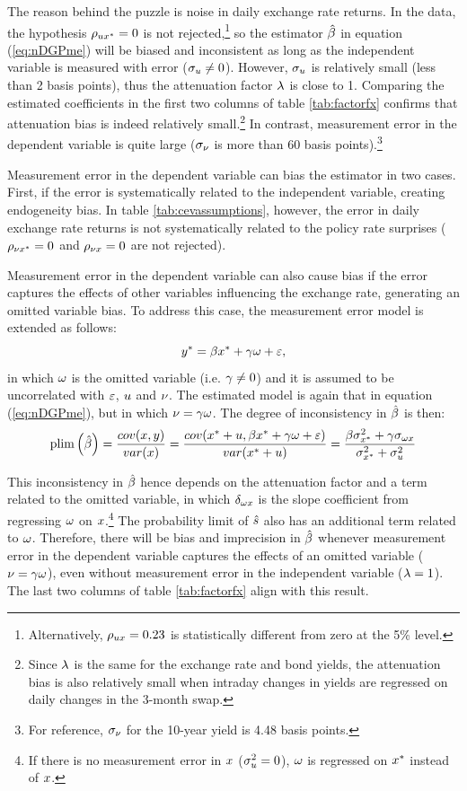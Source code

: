 \documentclass[a4paper,12pt]{article} 		%
\begin{document}
\begin{appendices}
The reason behind the puzzle is noise in daily exchange rate returns. In the data, the hypothesis \(\rho_{u x^{*}} = 0\) is not rejected,\footnote{Alternatively, \(\rho_{u x} = 0.23\) is statistically different from zero at the 5\% level.} so the estimator \(\hat{\beta}\) in equation (\ref{eq:nDGPme}) will be biased and inconsistent as long as the independent variable is measured with error (\(\sigma_{u} \neq 0\)). 
However, \(\sigma_{u}\) is relatively small (less than 2 basis points), thus the attenuation factor \(\lambda\) is close to 1. Comparing the estimated coefficients in the first two columns of table \ref{tab:factorfx} confirms that attenuation bias is indeed relatively small.\footnote{Since \(\lambda\) is the same for the exchange rate and bond yields, the attenuation bias is also relatively small when intraday changes in yields are regressed on daily changes in the 3-month swap.} In contrast, measurement error in the dependent variable is quite large (\(\sigma_{\nu}\) is more than 60 basis points).\footnote{For reference, \(\sigma_{\nu}\) for the 10-year yield is 4.48 basis points.} 

Measurement error in the dependent variable can bias the estimator in two cases. First, if the error is systematically related to the independent variable, creating endogeneity bias. In table \ref{tab:cevassumptions}, however, the error in daily exchange rate returns is not systematically related to the policy rate surprises (\(\rho_{\nu x^{*}} = 0\) and \(\rho_{\nu x} = 0\) are not rejected). 

Measurement error in the dependent variable can also cause bias if the error captures the effects of other variables influencing the exchange rate, generating an omitted variable bias. To address this case, the measurement error model is extended as follows:
\[y^{*} = \beta x^{*} + \gamma \omega + \varepsilon,\]
\noindent in which \(\omega\) is the omitted variable (i.e. \(\gamma \neq 0\)) and it is assumed to be uncorrelated with \(\varepsilon\), \(u\) and \(\nu\). The estimated model is again that in equation (\ref{eq:nDGPme}), but in which \(\nu = \gamma \omega\). The degree of inconsistency in \(\hat{\beta}\) is then:
\[\mathrm{plim} \left( \hat{\beta} \right) = \frac{cov(x, y)}{var(x)} = \frac{cov(x^{*} + u, \beta x^{*} + \gamma \omega + \varepsilon)}{var(x^{*} + u)} = \frac{\beta \sigma^{2}_{x^{*}} + \gamma \sigma_{\omega x}}{\sigma^{2}_{x^{*}} + \sigma^{2}_{u}}\]


This inconsistency in \(\hat{\beta}\) hence depends on the attenuation factor and a term related to the omitted variable, in which \(\delta_{\omega x}\) is the slope coefficient from regressing \(\omega\) on \(x\).\footnote{If there is no measurement error in \(x\) (\(\sigma^{2}_{u} = 0\)), \(\omega\) is regressed on \(x^{*}\) instead of \(x\).} The probability limit of \(\hat{s}\) also has an additional term related to \(\omega\). Therefore, there will be bias and imprecision in \(\hat{\beta}\) whenever measurement error in the dependent variable captures the effects of an omitted variable (\(\nu = \gamma \omega\)), even without measurement error in the independent variable (\(\lambda = 1\)). The last two columns of table \ref{tab:factorfx} align with this result.


\end{appendices}
\end{document}
